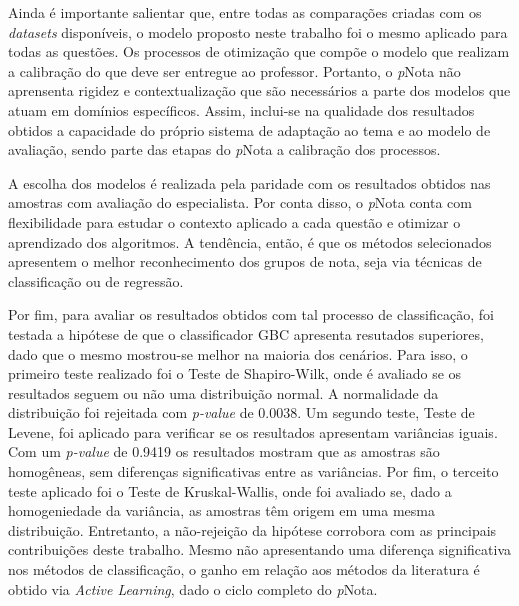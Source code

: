 Ainda é importante salientar que, entre todas as comparações criadas com os \textit{datasets} disponíveis, o modelo proposto neste trabalho foi o mesmo aplicado para todas as questões. Os processos de otimização que compõe o modelo que realizam a calibração do que deve ser entregue ao professor. Portanto, o \textit{p}Nota não aprensenta rigidez e contextualização que são necessários a parte dos modelos que atuam em domínios específicos. Assim, inclui-se na qualidade dos resultados obtidos a capacidade do próprio sistema de adaptação ao tema e ao modelo de avaliação, sendo parte das etapas do \textit{p}Nota a calibração dos processos.

A escolha dos modelos é realizada pela paridade com os resultados obtidos nas amostras com avaliação do especialista. Por conta disso, o \textit{p}Nota conta com flexibilidade para estudar o contexto aplicado a cada questão e otimizar o aprendizado dos algoritmos. A tendência, então, é que os métodos selecionados apresentem o melhor reconhecimento dos grupos de nota, seja via técnicas de classificação ou de regressão.

Por fim, para avaliar os resultados obtidos com tal processo de classificação, foi testada a hipótese de que o classificador GBC apresenta resutados superiores, dado que o mesmo mostrou-se melhor na maioria dos cenários. Para isso, o primeiro teste realizado foi o Teste de Shapiro-Wilk, onde é avaliado se os resultados seguem ou não uma distribuição normal. A normalidade da distribuição foi rejeitada com \textit{p-value} de 0.0038. Um segundo teste, Teste de Levene, foi aplicado para verificar se os resultados apresentam variâncias iguais. Com um \textit{p-value} de 0.9419 os resultados mostram que as amostras são homogêneas, sem diferenças significativas entre as variâncias. Por fim, o terceito teste aplicado foi o Teste de Kruskal-Wallis, onde foi avaliado se, dado a homogeniedade da variância, as amostras têm origem em uma mesma distribuição. Entretanto, a não-rejeição da hipótese corrobora com as principais contribuições deste trabalho. Mesmo não apresentando uma diferença significativa nos métodos de classificação, o ganho em relação aos métodos da literatura é obtido via \textit{Active Learning}, dado o ciclo completo do \textit{p}Nota.
